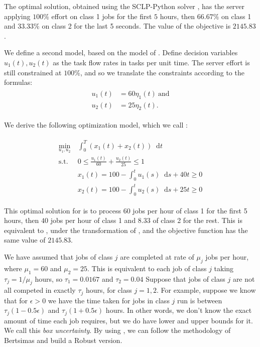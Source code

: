\documentclass[11pt,a4paper,titlepage]{article}
\newcommand*{\dd}{\ensuremath{\mathop{}\!\mathrm{d}}}%
\theoremstyle{definition}
\theoremstyle{plain}
\begin{document}
The optimal solution,
obtained using the SCLP-Python solver \autocite{Shindin_SCLPPython_2021},
has the server applying $100\%$ effort on class 1 jobs for the first $5$ hours,
then $66.67\%$ on class 1 and 33.33\% on class 2 for the last 5 seconds.
The value of the objective is $2145.83$.

We define a second model,
based on the model of \autocite{bertsimas2014robust}.
Define  decision variables $u_1(t), u_2(t)$ as the task flow rates
in tasks per unit time.
The server effort is still constrained at $100\%$,
and so we translate the constraints according to the formulas:
\begin{align}
\label{eq:model-2-translation}
\begin{split}
    u_1(t) & = 60 \eta_1(t) ~ \text{and} \\
    u_2(t) & = 25 \eta_2(t).
\end{split}
\end{align}

We derive the following optimization model,
which we call \modeltwo:

\begin{align}
\label{eq:model-2}
\begin{split}
    \min\limits_{u_1, u_2}
        &~ \int_0^T \left( x_1(t) + x_2(t) \right) \dd t \\
    \text{s.t.}
        &~ 0 \leq \frac{u_1(t)}{60} + \frac{u_2(t)}{25} \leq 1 \\
        &~ x_1(t) = 100 - \int_0^t u_1(s) \dd s + 40t \geq 0 \\
        &~ x_2(t) = 100 - \int_0^t u_2(s) \dd s + 25t \geq 0
\end{split}
\end{align}

This optimal solution for \modeltwo is to process $60$ jobs per hour of class 1
for the first 5 hours,
then $40$ jobs per hour of class 1 and $8.33$ of class 2 for the rest.
This is equivalent to \modelone,
under the transformation of ,
and the objective function has the same value of $2145.83$.

We have assumed that jobs of class $j$ are completed at rate of $\mu_j$ jobs per hour,
where $\mu_1=60$ and $\mu_2=25$.
This is equivalent to each job of class $j$ taking $\tau_j=1/\mu_j$ hours,
so $\tau_1=0.0167$ and $\tau_2 = 0.04$
Suppose that jobs of class $j$ are not all competed in exactly $\tau_j$ hours,
for class $j=1,2$.
For example,
suppose we know that for $\epsilon > 0$
we have the time taken for jobs in class $j$ run is between
$\tau_j (1 - 0.5 \epsilon)$
and
$\tau_j (1 + 0.5 \epsilon)$
hours.
In other words,
we don't know the exact amount of time each job requires,
but we do have lower and upper bounds for it.
We call this \textit{box uncertainty}.
By using \modeltwo,
we can follow the methodology of Bertsimas and build a Robust version.
\end{document}
